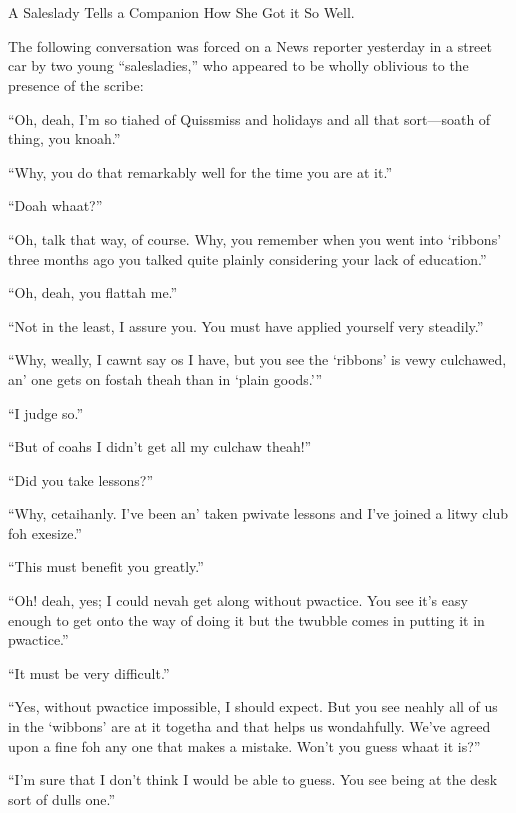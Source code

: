 \begin{ipquote}
\begin{center}
\\
\\
A Saleslady Tells a Companion How She Got it So Well.\\
\end{center}
The following conversation was forced on a News reporter yesterday in a street car by two young “salesladies,” who appeared to be wholly oblivious to the presence of the scribe:

“Oh, deah, I’m so tiahed of Quissmiss and holidays and all that sort—soath of thing, you knoah.”

“Why, you do that remarkably well for the time you are at it.”

“Doah whaat?”

“Oh, talk that way, of course. Why, you remember when you went into ‘ribbons’ three months ago you talked quite plainly considering your lack of education.”

“Oh, deah, you flattah me.”

“Not in the least, I assure you. You must have applied yourself very steadily.”

“Why, weally, I cawnt say os I have, but you see the ‘ribbons’ is vewy culchawed, an’ one gets on fostah theah than in ‘plain goods.’”

“I judge so.”

“But of coahs I didn’t get all my culchaw theah!”

“Did you take lessons?”

“Why, cetaihanly. I’ve been an’ taken pwivate lessons and I’ve joined a litwy club foh exesize.”

“This must benefit you greatly.”

“Oh! deah, yes; I could nevah get along without pwactice. You see it’s easy enough to get onto the way of doing it but the twubble comes in putting it in pwactice.”

“It must be very difficult.”

“Yes, without pwactice impossible, I should expect. But you see neahly all of us in the ‘wibbons’ are at it togetha and that helps us wondahfully. We’ve agreed upon a fine foh any one that makes a mistake. Won’t you guess whaat it is?”

{“I’m sure that I don’t think I would be able to guess. You see being at the desk sort of dulls one.”

}
\end{ipquote}
